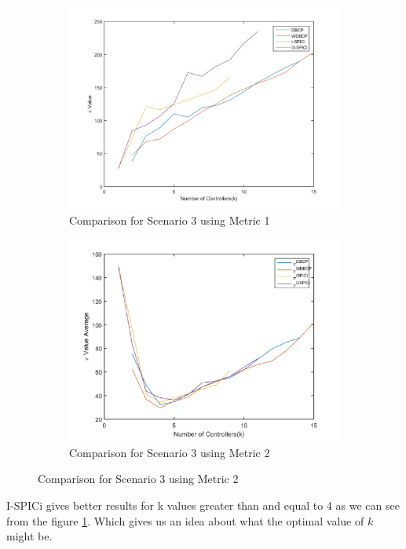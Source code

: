 \documentclass[10pt]{extarticle}
\begin{document}
	\begin{figure}
		\begin{subfigure}{0.5\linewidth}
			\includegraphics[width=\linewidth]{comparison_3.png}
			\caption{Comparison for Scenario 3 using Metric 1}
			\label{fig:comp3}
		\end{subfigure}
		\begin{subfigure}{0.5\linewidth}
			\includegraphics[width=\linewidth]{our_comp_3.png}
			\caption{Comparison for Scenario 3 using Metric 2}
			\label{fig:ourcomp3}
		\end{subfigure}
	\end{figure}
	I-SPICi gives better results for k values greater than and equal to 4 as we can see from the figure \ref{fig:comp3}. Which gives us an idea about what the optimal value of $k$ might be.
	
\end{document}
